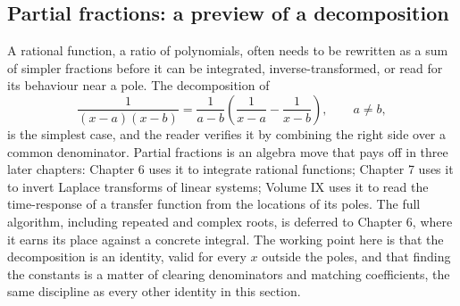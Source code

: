 \subsection{Partial fractions: a preview of a decomposition}

A rational function, a ratio of polynomials, often needs to be
rewritten as a sum of simpler fractions before it can be integrated,
inverse-transformed, or read for its behaviour near a pole. The
decomposition of
\[
\frac{1}{(x - a)(x - b)}
= \frac{1}{a - b}\left(\frac{1}{x - a} - \frac{1}{x - b}\right),
\qquad a \neq b,
\]
is the simplest case, and the reader verifies it by combining the
right side over a common denominator. Partial fractions is an algebra
move that pays off in three later chapters: Chapter 6 uses it to
integrate rational functions; Chapter 7 uses it to invert Laplace
transforms of linear systems; Volume IX uses it to read the
time-response of a transfer function from the locations of its poles.
The full algorithm, including repeated and complex roots, is deferred
to Chapter 6, where it earns its place against a concrete integral.
The working point here is that the decomposition is an identity, valid
for every $x$ outside the poles, and that finding the constants is a
matter of clearing denominators and matching coefficients, the same
discipline as every other identity in this section.

